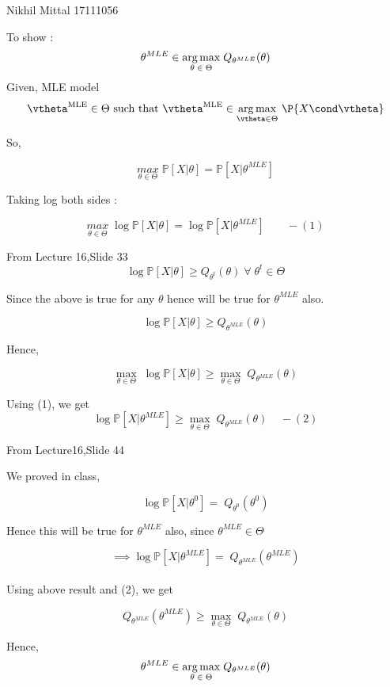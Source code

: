 \documentclass[a4paper,11pt]{article}
\begin{document}
								{Nikhil Mittal}      						           		%
								{17111056}																		%

\begin{mlsolution}

To show :\\
\[
\theta^{MLE} \in \underset{\theta \; \in \; \Theta }{\arg \max} \; Q_{\theta^{MLE}} (\theta)\\
\]
Given, MLE model 
\[
\vtheta^{\text{MLE}} \in \Theta \text{ such that } \vtheta^{\text{MLE}} \in \underset{\vtheta \in \Theta}{\arg\max}\ \P{X\cond\vtheta}
\]

So,

\[
\underset{\theta \in \Theta}{max} \; \mathbb{P} [X|\theta] = \mathbb{P}[X|\theta^{MLE}]
\]

Taking log both sides :

\[
\underset{\theta \in \Theta}{max} \; \log\mathbb{P} [X|\theta] =\log \mathbb{P}[X|\theta^{MLE}] \;\;\;\;\;\;\;- (1)
\]

From Lecture 16,Slide 33
\[
\log\mathbb{P} [X|\theta] \geq Q_{\theta^t}(\theta) \;\forall \;\theta^t \in \Theta
\]

Since the above is true for any $\theta$ hence will be true for $\theta^{MLE}$ also.

\[
\log\mathbb{P} [X|\theta] \geq Q_{\theta^{MLE}}(\theta)
\]

Hence, 

\[
\underset{\theta \in \Theta}{\max} \;\log\mathbb{P} [X|\theta] \geq \underset{\theta \in \Theta}{\max} \;Q_{\theta^{MLE}}(\theta)
\]

Using (1), we get
\[
\log \mathbb{P}[X|\theta^{MLE}] \geq \underset{\theta \in \Theta}{\max} \;Q_{\theta^{MLE}}(\theta)   \;\;\;\;-(2)
\]

From Lecture16,Slide 44

We proved in class,

\[
\log \mathbb{P}[X|\theta^{0}] = \;Q_{\theta^{0}}(\theta^{0})
\]

Hence this will be true for $\theta^{MLE}$ also, since $\theta^{MLE} \in \Theta$

\[
\implies \log \mathbb{P}[X|\theta^{MLE}] = \;Q_{\theta^{MLE}}(\theta^{MLE})
\]\\

Using above result and (2), we get

\[
Q_{\theta^{MLE}}(\theta^{MLE}) \geq \underset{\theta \in \Theta}{\max} \;Q_{\theta^{MLE}}(\theta)
\]

Hence,
\[
\theta^{MLE} \in \underset{\theta \; \in \; \Theta }{\arg \max} \; Q_{\theta^{MLE}} (\theta)\\
\]

\end{mlsolution}
\end{document}
